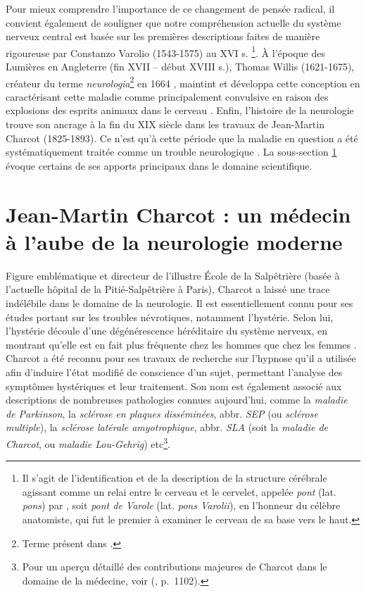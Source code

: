 Pour mieux comprendre l'importance de ce changement de pensée radical, il convient également de souligner que notre compréhension actuelle du système nerveux central est basée sur les premières descriptions faites de manière rigoureuse par Constanzo Varolio (1543-1575) au XVI\ieme{} s. \citep[p.~734]{tubbs2008costanzo}\footnote{Il s'agit de l'identification et de la description de la structure cérébrale agissant comme un relai entre le cerveau et le cervelet, appelée \textit{pont} (lat. \textit{pons}) par \citet{varolio1969nervis}, soit \textit{pont de Varole} (lat. \textit{pons Varolii}), en l'honneur du célèbre anatomiste, qui fut le premier à examiner le cerveau de sa base vers le haut.  
}. À l'époque des Lumières en Angleterre (fin XVII\ieme{} -- début XVIII\ieme{} s.), Thomas Willis (1621-1675), créateur du terme \textit{neurologia}\footnote{Terme présent dans \citet{willis1664cerebri}.} en 1664 \citep[p.~2]{monteiro2021}, maintint et développa cette conception en caractérisant cette maladie comme principalement convulsive en raison des explosions des \og{}esprits animaux\fg{} dans le cerveau \citep[p.~1]{willis1681essay}. Enfin, l'histoire de la neurologie trouve son ancrage à la fin du XIX\ieme{} siècle dans les travaux de Jean-Martin Charcot (1825-1893). Ce n'est qu'à cette période que la maladie en question a été systématiquement traitée comme un trouble neurologique \citep[p.~114]{tasca2012women}. La sous-section \ref{JMC_polymathe} évoque certains de ses apports principaux dans le domaine scientifique.

\section{Jean-Martin Charcot : un médecin à l'aube de la neurologie moderne}
\label{JMC_polymathe}

Figure emblématique et directeur de l'illustre École de la Salpêtrière (basée à l'actuelle hôpital de la Pitié-Salpêtrière à Paris), Charcot a laissé une trace indélébile dans le domaine de la neurologie. 
Il est essentiellement connu pour ses études portant sur les troubles névrotiques, notamment l'hystérie. Selon lui, l'hystérie découle d'une dégénérescence héréditaire du système nerveux, en montrant qu'elle est en fait plus fréquente chez les hommes que chez les femmes \citep[p.~114]{tasca2012women}. Charcot a été reconnu pour ses travaux de recherche sur l'hypnose qu'il a utilisée afin d'induire l'état modifié de conscience d'un sujet, permettant l'analyse des symptômes hystériques et leur traitement. 
Son nom est également associé aux descriptions de nombreuses pathologies connues aujourd'hui, comme la \textit{maladie de Parkinson}, la \textit{sclérose en plaques disséminées}, abbr. \textit{SEP} (ou \textit{sclérose multiple}), la \textit{sclérose latérale amyotrophique}, abbr. \textit{SLA} (soit la \textit{maladie de Charcot}, ou \textit{maladie Lou-Gehrig}) etc\footnote{Pour un aperçu détaillé des contributions majeures de Charcot dans le domaine de la médecine, voir \citeauthor{camargo2024} (\citeyear{camargo2024}, p.~1102).}.

